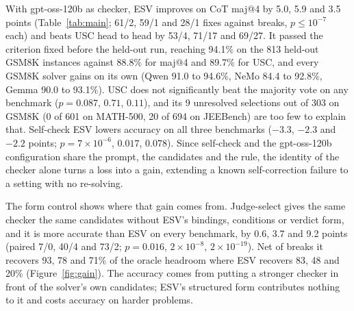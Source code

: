 \documentclass[letterpaper]{article} %
\begin{document}
With gpt-oss-120b as checker, ESV improves on CoT maj@4 by 5.0, 5.9 and 3.5 points (Table~\ref{tab:main}; 61/2, 59/1 and 28/1 fixes against breaks, $p \le 10^{-7}$ each) and beats USC head to head by 53/4, 71/17 and 69/27. It passed the criterion fixed before the held-out run, reaching 94.1\% on the 813 held-out GSM8K instances against 88.8\% for maj@4 and 89.7\% for USC, and every GSM8K solver gains on its own (Qwen 91.0 to 94.6\%, NeMo 84.4 to 92.8\%, Gemma 90.0 to 93.1\%). USC does not significantly beat the majority vote on any benchmark ($p = 0.087$, $0.71$, $0.11$), and its 9 unresolved selections out of 303 on GSM8K (0 of 601 on MATH-500, 20 of 694 on JEEBench) are too few to explain that. Self-check ESV lowers accuracy on all three benchmarks ($-3.3$, $-2.3$ and $-2.2$ points; $p = 7\times10^{-6}$, $0.017$, $0.078$). Since self-check and the gpt-oss-120b configuration share the prompt, the candidates and the rule, the identity of the checker alone turns a loss into a gain, extending a known self-correction failure \cite{huang2024large} to a setting with no re-solving.

The form control shows where that gain comes from. Judge-select gives the same checker the same candidates without ESV's bindings, conditions or verdict form, and it is more accurate than ESV on every benchmark, by 0.6, 3.7 and 9.2 points (paired 7/0, 40/4 and 73/2; $p = 0.016$, $2\times10^{-8}$, $2\times10^{-19}$). Net of breaks it recovers 93, 78 and 71\% of the oracle headroom where ESV recovers 83, 48 and 20\% (Figure~\ref{fig:gain}). The accuracy comes from putting a stronger checker in front of the solver's own candidates; ESV's structured form contributes nothing to it and costs accuracy on harder problems.
\end{document}
